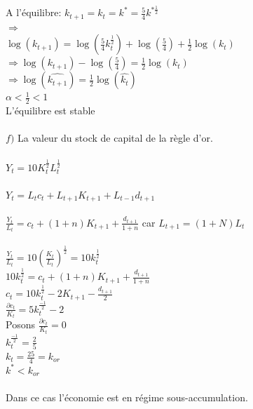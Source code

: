\documentclass[11pt,twoside,a4paper]{article}
\begin{document}
A l'équilibre: \: $k_{t+1}=k_t=k^*=\frac{5}{4}k^{*\frac{1}{2}}$\\

$ \Rightarrow$   \\

$\log{(k_{t+1})}=\log{(\frac{5}{4}k_t^{\frac{1}{2}})}+\log{(\frac{5}{4})}+\frac{1}{2}\log{(k_t)}$\\

$
\Rightarrow \log{(k_{t+1})} -\log{(\frac{5}{4})}=\frac{1}{2}\log{(k_t)}$\\

$
\Rightarrow \log{(\widehat{k_{t+1}})}=\frac{1}{2}\log{(\widehat{k_{t}})}$\\

$
 \alpha <\frac{1}{2}<1$\\
 L'équilibre est stable\\\\
 $ f)$ La valeur du stock de capital de la règle d'or.\\\\
 $Y_t=10K_t^{\frac{1}{2}}L_t^{\frac{1}{2}}$\\\\
 $Y_t=L_tc_t+L_{t+1}K_{t+1}+L_{t-1}d_{t+1}$\\\\
 $\frac{Y_t}{L_t}=c_t+(1+n)K_{t+1}+\frac{d_{t+1}}{1+n}$\: car $L_{t+1}=(1+N)L_t$\\\\     
$ \frac{Y_t}{L_t}=10(\frac{K_t}{L_t})^{\frac{1}{2}}=10k_t^{\frac{1}{2}}$\\

$ 10k_t^{\frac{1}{2}}=c_t+(1+n)K_{t+1}+\frac{d_{t+1}}{1+n}$\\
 
 $ c_t=10k_t^{\frac{1}{2}}-2K_{t+1}-\frac{d_{t+1}}{2}$\\
 
 $\frac{\partial c_t}{K_t}=5k_t^\frac{-1}{2}-2$\\
 
  Posons $\frac{\partial c_t}{K_t}=0$\\
  
  $k_t^\frac{-1}{2}=\frac{2}{5}$\\
  
  $k_t=\frac{25}{4}=k_{or}$\\

  $k^*<k_{or}$\\\\
  Dans ce cas l'économie est en régime sous-accumulation.\\
  
\end{document}
